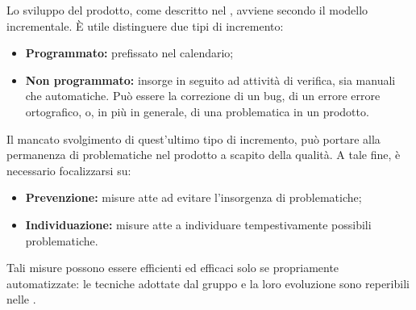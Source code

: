 Lo sviluppo del prodotto, come descritto nel \PdP , avviene secondo il {modello incrementale}. \`E utile distinguere due tipi di incremento:
\begin{itemize}
	\item \textbf{Programmato:} prefissato nel calendario;
	\item \textbf{Non programmato:} insorge in seguito ad attività di verifica, sia manuali che automatiche. Può essere la correzione di un {bug}, di un errore errore ortografico, o, in più in generale, di una problematica in un prodotto.
\end{itemize}
Il mancato svolgimento di quest'ultimo tipo di incremento, può portare alla permanenza di problematiche nel prodotto a scapito della qualità. A tale fine, è necessario focalizzarsi su:
\begin{itemize}
	\item \textbf{Prevenzione:} misure atte ad evitare l'insorgenza di problematiche;
	\item \textbf{Individuazione:} misure atte a individuare tempestivamente possibili problematiche.
\end{itemize}
Tali misure possono essere {efficienti} ed {efficaci} solo se propriamente automatizzate: le tecniche adottate dal gruppo \gruppo \space e la loro evoluzione sono reperibili nelle \NdP . 
 
